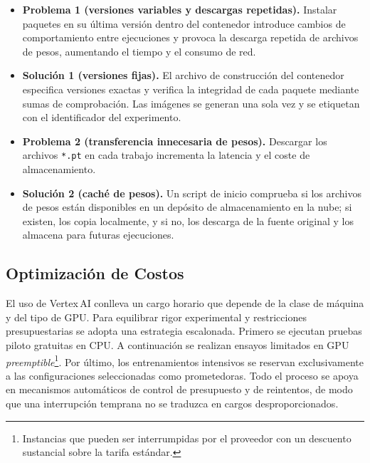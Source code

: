 \begin{itemize}
  \item \textbf{Problema 1 (versiones variables y descargas repetidas).}
        Instalar paquetes en su última versión dentro del contenedor introduce cambios de comportamiento entre ejecuciones y provoca la descarga repetida de archivos de pesos, aumentando el tiempo y el consumo de red.
  \item \textbf{Solución 1 (versiones fijas).}
        El archivo de construcción del contenedor especifica versiones exactas y verifica la integridad de cada paquete mediante sumas de comprobación.
        Las imágenes se generan una sola vez y se etiquetan con el identificador del experimento.
  \item \textbf{Problema 2 (transferencia innecesaria de pesos).}
        Descargar los archivos \texttt{*.pt} en cada trabajo incrementa la latencia y el coste de almacenamiento.
  \item \textbf{Solución 2 (caché de pesos).}
        Un script de inicio comprueba si los archivos de pesos están disponibles en un depósito de almacenamiento en la nube; si existen, los copia localmente, y si no, los descarga de la fuente original y los almacena para futuras ejecuciones.
\end{itemize}

\subsection{Optimización de Costos}

El uso de Vertex\,AI conlleva un cargo horario que depende de la clase de máquina y del tipo de GPU.
Para equilibrar rigor experimental y restricciones presupuestarias se adopta una estrategia escalonada.
Primero se ejecutan pruebas piloto gratuitas en CPU.
A continuación se realizan ensayos limitados en GPU \emph{preemptible}\footnote{Instancias que pueden ser interrumpidas por el proveedor con un descuento sustancial sobre la tarifa estándar.}.
Por último, los entrenamientos intensivos se reservan exclusivamente a las configuraciones seleccionadas como prometedoras.
Todo el proceso se apoya en mecanismos automáticos de control de presupuesto y de reintentos, de modo que una interrupción temprana no se traduzca en cargos desproporcionados.

